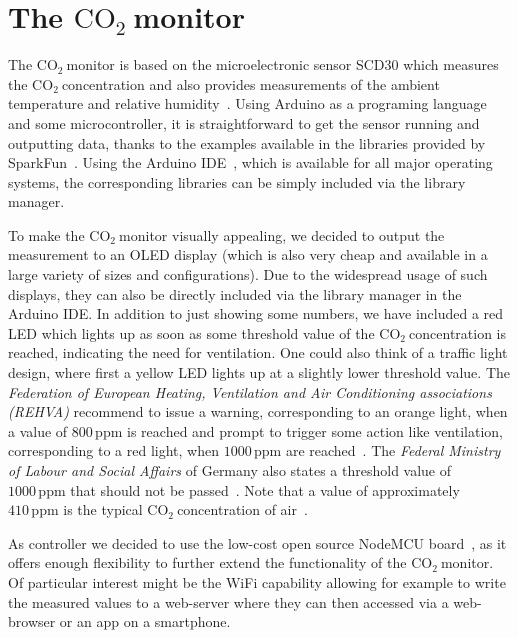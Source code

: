 \documentclass[12pt,a4paper]{article}
\newcommand{\coo}{\ensuremath{\mathrm{CO_2}~}}
\begin{document}
\section{The \coo monitor}
The \coo monitor is based on the microelectronic sensor SCD30 which measures the \coo concentration and also provides measurements of the ambient temperature and relative humidity~\cite{SENSIRION2020B}. Using Arduino as a programing language and some microcontroller, it is straightforward to get the sensor running and outputting data, thanks to the examples available in the libraries provided by SparkFun~\cite{SPARKFUN2020}. Using the Arduino IDE~\cite{ARDUINOIDE2020}, which is available for all major operating systems, the corresponding libraries can be simply included via the library manager. 

To make the \coo monitor visually appealing, we decided to output the measurement to an OLED display (which is also very cheap and available in a large variety of sizes and configurations). Due to the widespread usage of such displays, they can also be directly included via the library manager in the Arduino IDE. In addition to just showing some numbers, we have included a red LED which lights up as soon as some threshold value of the \coo concentration is reached, indicating the need for ventilation. One could also think of a traffic light design, where first a yellow LED lights up at a slightly lower threshold value. The \textit{Federation of European Heating, Ventilation and Air Conditioning associations (REHVA)} recommend to issue a warning, corresponding to an orange light, when a value of $800\,\mathrm{ppm}$ is reached and prompt to trigger some action like ventilation, corresponding to a red light, when $1000\,\mathrm{ppm}$ are reached~\cite{REHVA2020}. The \textit{Federal Ministry of Labour and Social Affairs} of Germany also states a threshold value of $1000\,\mathrm{ppm}$ that should not be passed~\cite{BMA2020}. Note that a value of approximately $410\,\mathrm{ppm}$ is the typical \coo concentration of air~\cite{NOAA2020}.

As controller we decided to use the low-cost open source NodeMCU board~\cite{NODEMCU2020}, as it offers enough flexibility to further extend the functionality of the \coo monitor. Of particular interest might be the WiFi capability allowing for example to write the measured values to a web-server where they can then accessed via a web-browser or an app on a smartphone. 
\end{document}
